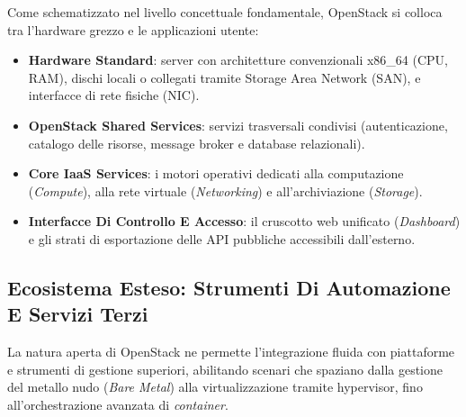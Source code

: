 \documentclass[11pt, a4paper]{article}
\begin{document}
Come schematizzato nel livello concettuale fondamentale, OpenStack si colloca tra l'hardware grezzo e le applicazioni utente:
\begin{itemize}[noitemsep]
    \item \textbf{Hardware Standard}: server con architetture convenzionali x86\_64 (CPU, RAM), dischi locali o collegati tramite Storage Area Network (SAN), e interfacce di rete fisiche (NIC).
    \item \textbf{OpenStack Shared Services}: servizi trasversali condivisi (autenticazione, catalogo delle risorse, message broker e database relazionali).
    \item \textbf{Core IaaS Services}: i motori operativi dedicati alla computazione (\emph{Compute}), alla rete virtuale (\emph{Networking}) e all'archiviazione (\emph{Storage}).
    \item \textbf{Interfacce Di Controllo E Accesso}: il cruscotto web unificato (\emph{Dashboard}) e gli strati di esportazione delle API pubbliche accessibili dall'esterno.
\end{itemize}

\subsection{Ecosistema Esteso: Strumenti Di Automazione E Servizi Terzi}

La natura aperta di OpenStack ne permette l'integrazione fluida con piattaforme e strumenti di gestione superiori, abilitando scenari che spaziano dalla gestione del metallo nudo (\emph{Bare Metal}) alla virtualizzazione tramite hypervisor, fino all'orchestrazione avanzata di \emph{container}.

\end{document}
